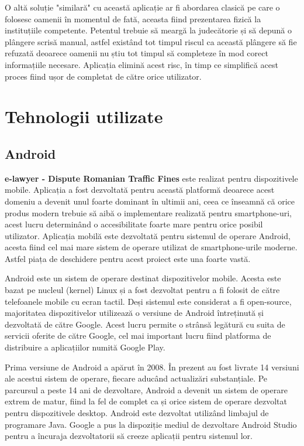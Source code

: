 \documentclass[12pt,a4paper]{report}
\theoremstyle{definition}
\theoremstyle{remark}
\begin{document}
O altă soluție "similară" cu această aplicație ar fi abordarea clasică pe care o folosesc oamenii în momentul de fată, aceasta fiind prezentarea fizică la instituțiile competente. Petentul trebuie să meargă la judecătorie și să depună o plângere scrisă manual, astfel existând tot timpul riscul ca această plângere să fie refuzată deoarece oamenii nu știu tot timpul să completeze în mod corect informațiile necesare. Aplicația elimină acest risc, în timp ce simplifică acest proces fiind ușor de completat de către orice utilizator.
\newpage

\chapter{Tehnologii utilizate}
\section{Android}
\textbf{e-lawyer - Dispute Romanian Traffic Fines} este realizat pentru dispozitivele mobile. Aplicația a fost dezvoltată pentru această platformă deoarece acest domeniu a devenit unul foarte dominant în ultimii ani, ceea ce înseamnă că orice produs modern trebuie să aibă o implementare realizată pentru smartphone-uri, acest lucru determinând o accesibilitate foarte mare pentru orice posibil utilizator. Aplicația mobilă este dezvoltată pentru sistemul de operare Android, acesta fiind cel mai mare sistem de operare utilizat de smartphone-urile moderne. Astfel piața de deschidere pentru acest proiect este una foarte vastă.

Android este un sistem de operare destinat dispozitivelor mobile. Acesta este bazat pe nucleul (kernel) Linux și a fost dezvoltat pentru a fi folosit de către telefoanele mobile cu ecran tactil. Deși sistemul este considerat a fi open-source, majoritatea dispozitivelor utilizează o versiune de Android întreținută și dezvoltată de către Google. Acest lucru permite o strânsă legătură cu suita de servicii oferite de către Google, cel mai important lucru fiind platforma de distribuire a aplicațiilor numită Google Play.

Prima versiune de Android a apărut în 2008. În prezent au fost livrate 14 versiuni ale acestui sistem de operare, fiecare aducând actualizări substanțiale. Pe parcursul a peste 14 ani de dezvoltare, Android a devenit un sistem de operare extrem de matur, fiind la fel de complet ca și orice sistem de operare dezvoltat pentru dispozitivele desktop. Android este dezvoltat utilizând limbajul de programare Java. Google a pus la dispoziție mediul de dezvoltare Android Studio pentru a încuraja dezvoltatorii să creeze aplicații pentru sistemul lor.
\end{document}
